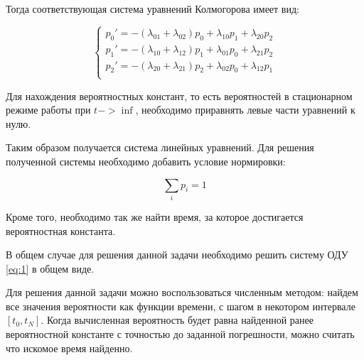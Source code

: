 \clearpage

Тогда соответствующая система уравнений Колмогорова имеет вид:

\begin{equation} \label{eq:1}
    \begin{cases}
        p_0' = - (\lambda_{01} + \lambda_{02})p_0 + \lambda_{10}p_1+\lambda_{20}p_2\\
        p_1' = - (\lambda_{10} + \lambda_{12})p_1 + \lambda_{01}p_0+\lambda_{21}p_2\\
        p_2' = - (\lambda_{20} + \lambda_{21})p_2 + \lambda_{02}p_0+\lambda_{12}p_1\\
    \end{cases}
\end{equation}

Для нахождения вероятностных констант, то есть вероятностей в стационарном режиме работы при $t -> \inf$, необходимо приравнять левые части уравнений к нулю. 

Таким образом получается система линейных уравнений. Для решения полученной системы необходимо добавить условие нормировки: 

\begin{equation}
    \sum_{i}p_i = 1
\end{equation}
 
Кроме того, необходимо так же найти время, за которое достигается вероятностная константа. 

В общем случае для решения данной задачи необходимо решить систему ОДУ \ref{eq:1} в общем виде. 

Для решения данной задачи можно воспользоваться численным методом: найдем все значения вероятности как функции времени, с шагом в некотором интервале $[t_0, t_N]$. Когда вычисленная вероятность будет равна найденной ранее вероятностной константе с точностью до заданной погрешности, можно считать что искомое время найденно.
